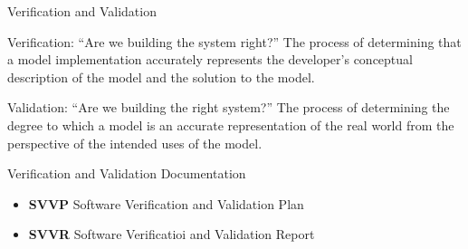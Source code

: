 \documentclass[aspectratio=1610,xcolor=dvipsnames,t,compress]{beamer}
\begin{document}
\begin{frame}{Verification and Validation}
    \begin{block}{Verification: “Are we building the system right?”}
        The process of determining that a model implementation accurately 
        represents the developer's conceptual description of the 
        model and the solution to the model. 
    \end{block}

    \begin{block}{Validation: “Are we building the right system?”}
        The process of determining the degree to which a model is an 
        accurate representation of the real world from the 
        perspective of the intended uses of the model. 
    \end{block}

    \begin{block}{Verification and Validation Documentation}
        \begin{itemize}
            \item \textbf{SVVP} Software Verification and Validation Plan
            \item \textbf{SVVR} Software Verificatioi and Validation Report
        \end{itemize}
    \end{block}

\end{frame}
\end{document}
